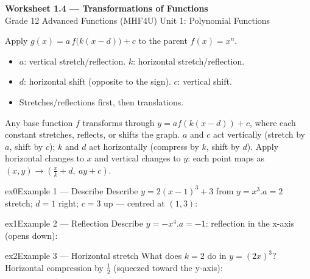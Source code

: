 \documentclass[11pt]{article}
\begin{document}
\begin{center}
{\LARGE\bfseries\color{titleblue}Worksheet 1.4 --- Transformations of Functions}\\[2pt]
{\small Grade 12 Advanced Functions (MHF4U) \textperiodcentered{} Unit 1: Polynomial Functions}
\end{center}

\begin{ideabox}
Apply $g(x)=a\,f\big(k(x-d)\big)+c$ to the parent $f(x)=x^n$.
\begin{itemize}[leftmargin=*,itemsep=2pt]
  \item $a$: vertical stretch/reflection. $k$: horizontal stretch/reflection.
  \item $d$: horizontal shift (opposite to the sign). $c$: vertical shift.
  \item Stretches/reflections first, then translations.
\end{itemize}
\end{ideabox}

\begin{learnbox}
Any base function $f$ transforms through $y=af\!\left(k(x-d)\right)+c$, where each constant stretches, reflects, or shifts the graph.
$a$ and $c$ act vertically (stretch by $a$, shift by $c$); $k$ and $d$ act horizontally (compress by $k$, shift by $d$).
Apply horizontal changes to $x$ and vertical changes to $y$: each point maps as $(x,y)\to\left(\tfrac{x}{k}+d,\ ay+c\right)$.
\end{learnbox}


\begin{example}{ex0}{Example 1 --- Describe}
Describe $y=2(x-1)^3+3$ from $y=x^3$.\soln $a=2$ stretch; $d=1$ right; $c=3$ up — centred at $(1,3)$:
\end{example}

\begin{example}{ex1}{Example 2 --- Reflection}
Describe $y=-x^4$.\soln $a=-1$: reflection in the x-axis (opens down):
\end{example}

\begin{example}{ex2}{Example 3 --- Horizontal stretch}
What does $k=2$ do in $y=(2x)^3$?\soln Horizontal compression by $\tfrac12$ (squeezed toward the y-axis):
\end{example}
\end{document}
